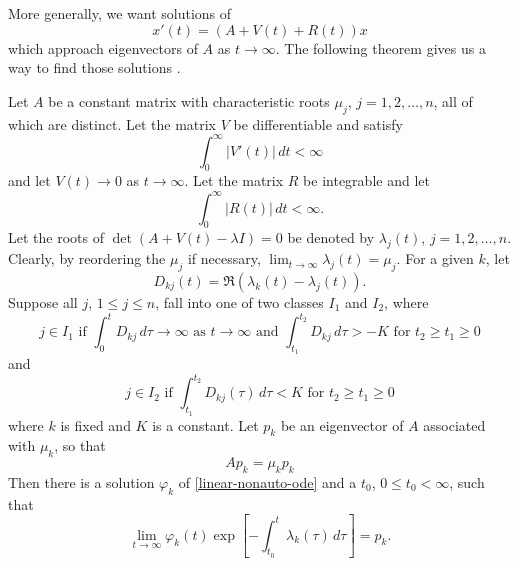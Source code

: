 More generally, we want solutions of
\begin{equation}\label{linear-nonauto-ode}
	x'(t) = (A+ V(t) + R(t))x
\end{equation}
which approach eigenvectors of \(A\) as \(t\to \infty\). The following theorem gives us a way to find those solutions \cite[Chp.~3, Thm.~8.1]{coddington1955theory}.
\begin{theorem}\label{thm:coddington}
	Let \(A\) be a constant matrix with characteristic roots \(\mu_j\), \(j=1,2,\ldots, n\), all of which are distinct. Let the matrix \(V\) be differentiable and satisfy
	\begin{equation}
		\int_0^\infty |V'(t)|\, dt < \infty
	\end{equation}
	and let \(V(t) \to 0\) as \(t\to\infty\). Let the matrix \(R\) be integrable and let 
	\begin{equation}
		\int_0^\infty |R(t)|\, dt < \infty.
	\end{equation}
	Let the roots of \(\det(A+V(t) -\lambda I) = 0\) be denoted by \(\lambda_j(t)\), \(j = 1,2 ,\ldots, n\). Clearly, by reordering the \(\mu_j\) if necessary, \(\lim_{t\to\infty} \lambda_j(t) = \mu_j\). For a given \(k\), let 
	\begin{equation}
		D_{kj}(t) = \Re(\lambda_k(t) - \lambda_j(t)).
	\end{equation}
	Suppose all \(j\), \(1\leq j \leq n\), fall into one of two classes \(I_1\) and \(I_2\), where
	\begin{equation}
		j \in I_1 \text{ if } \int_0^t D_{kj}\, d\tau \to \infty \text{ as } t\to\infty \text{ and } \int_{t_1}^{t_2} D_{kj}\, d\tau > -K \text{ for }t_2\geq t_1 \geq 0
	\end{equation}
	and 
	\begin{equation}
		j \in I_2 \text{ if } \int_{t_1}^{t_2} D_{kj}(\tau) \, d\tau  < K \text{ for } t_2\geq t_1\geq 0
	\end{equation}
	where \(k\) is fixed and \(K\) is a constant. Let \(p_k\) be an eigenvector of \(A\) associated with \(\mu_k\), so that 
	\begin{equation}
		Ap_k = \mu_k p_k
	\end{equation}
	Then there is a solution \(\varphi_k\) of \cref{linear-nonauto-ode} and a \(t_0\), \(0\leq t_0< \infty\), such that
	\begin{equation}
		\lim_{t\to\infty} \varphi_k(t) \exp\left[ - \int_{t_0}^ t \lambda_k(\tau) \, d\tau \right] = p_k.
	\end{equation}
\end{theorem}

